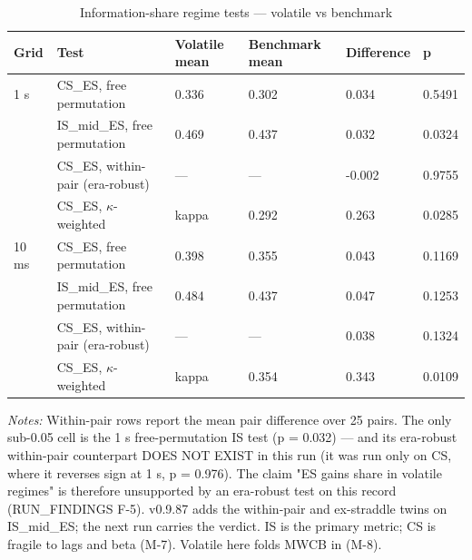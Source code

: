 \begin{table}[htbp]\centering
\caption{Information-share regime tests — volatile vs benchmark}
\label{tab:t8}
\small
\begin{tabular}{llllll}
\toprule
Grid & Test & Volatile mean & Benchmark mean & Difference & p \\
\midrule
1 s & CS\_ES, free permutation & 0.336 & 0.302 & 0.034 & 0.5491 \\
 & IS\_mid\_ES, free permutation & 0.469 & 0.437 & 0.032 & 0.0324 \\
 & CS\_ES, within-pair (era-robust) & — & — & -0.002 & 0.9755 \\
 & CS\_ES, $\kappa$-weighted & kappa & 0.292 & 0.263 & 0.0285 \\
\midrule
10 ms & CS\_ES, free permutation & 0.398 & 0.355 & 0.043 & 0.1169 \\
 & IS\_mid\_ES, free permutation & 0.484 & 0.437 & 0.047 & 0.1253 \\
 & CS\_ES, within-pair (era-robust) & — & — & 0.038 & 0.1324 \\
 & CS\_ES, $\kappa$-weighted & kappa & 0.354 & 0.343 & 0.0109 \\
\bottomrule
\end{tabular}
\begin{minipage}{\linewidth}\vspace{2pt}\footnotesize\emph{Notes:} Within-pair rows report the mean pair difference over 25 pairs. The only sub-0.05 cell is the 1 s free-permutation IS test (p = 0.032) — and its era-robust within-pair counterpart DOES NOT EXIST in this run (it was run only on CS, where it reverses sign at 1 s, p = 0.976). The claim "ES gains share in volatile regimes" is therefore unsupported by an era-robust test on this record (RUN\_FINDINGS F-5). v0.9.87 adds the within-pair and ex-straddle twins on IS\_mid\_ES; the next run carries the verdict. IS is the primary metric; CS is fragile to lags and beta (M-7). Volatile here folds MWCB in (M-8).\end{minipage}
\end{table}

